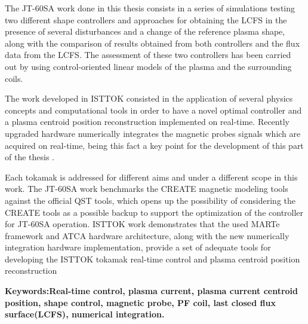 	
	The JT-60SA work done in this thesis consists in a series of simulations testing two different shape controllers and  approaches for obtaining the LCFS  in the presence of several disturbances and a change of the reference plasma shape, along with the comparison of results obtained from both controllers and the flux data from the LCFS.   The assessment of these two controllers has been carried out by using control-oriented linear models of the plasma and the surrounding coils.\smallskip
	
	The work developed in ISTTOK consisted in the application of several physics concepts and computational tools in order to have a novel optimal controller and a plasma centroid position reconstruction implemented on real-time. Recently upgraded hardware numerically integrates  the magnetic probes signals which are acquired on real-time, being this fact a key point for the development of this part of the thesis .\smallskip
	
	
	
	
	Each tokamak is addressed for different aims and under a different scope in this work. The JT-60SA work benchmarks the CREATE magnetic modeling tools against the official QST tools, which opens up the possibility of considering the CREATE tools as a possible backup to support the optimization of the controller for JT-60SA operation. ISTTOK work demonstrates that the used MARTe framework and ATCA hardware architecture, along with the new numerically integration hardware implementation, provide a set of adequate tools for developing the ISTTOK tokamak real-time control and plasma centroid position reconstruction
	
	
	
	\textbf{Keywords:Real-time control, plasma current, plasma current centroid position,   shape control, magnetic probe, PF coil, last closed flux surface(LCFS), numerical integration.} 
